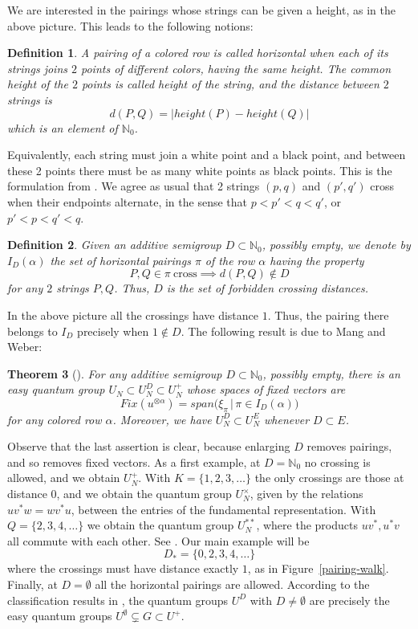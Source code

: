 \documentclass[11pt,a4paper]{article}
\newtheorem{thm}{Theorem}[section]
\newtheorem{defn}[thm]{Definition}
\begin{document}
We are interested in the pairings whose strings can be given a height, as in the above picture. This leads to the following notions:

\begin{defn}\label{horizontal}
A pairing of a colored row is called horizontal when each of its strings joins $2$ points of different colors, having the same height. The common height of the $2$ points is called height of the string, and the distance between $2$ strings is
\[
 d(P,Q)=|height(P)-height(Q)|
\]
which is an element of $\mathbb N_0$.
\end{defn}

Equivalently, each string must join a white point and a black point, and between these 2 points there must be as many white points as black points. This is the formulation from \cite{semi}. We agree as usual that 2 strings $(p,q)$ and $(p',q')$ cross when their endpoints alternate, in the sense that $p<p'<q<q'$, or $p'<p<q'<q$.

\begin{defn}\label{unitary-def}
Given an additive semigroup $D\subset\mathbb N_0$, possibly empty, we denote by $I_D(\alpha)$ the set of horizontal pairings $\pi$ of the row $\alpha$ having the property
\[
 P,Q\in\pi\ \text{cross}\implies d(P,Q)\notin D
\]
for any $2$ strings $P,Q$. Thus, $D$ is the set of forbidden crossing distances.
\end{defn}

In the above picture all the crossings have distance $1$. Thus, the pairing there belongs to $I_D$ precisely when $1\notin D$. The following result is due to Mang and Weber:

\begin{thm}[\cite{semi}]\label{mang-weber}
For any additive semigroup $D\subset\mathbb N_0$, possibly empty, there is an easy quantum group $U_N\subset U_N^D\subset U_N^+$ whose spaces of fixed vectors are
\[
 Fix(u^{\otimes\alpha})=span\big(\xi_\pi\,\big|\,\pi\in I_D(\alpha)\big)
\]
for any colored row $\alpha$. Moreover, we have $U_N^D\subset U_N^E$ whenever $D\subset E$.
\end{thm}

Observe that the last assertion is clear, because enlarging $D$ removes pairings, and so removes fixed vectors. As a first example, at $D=\mathbb N_0$ no crossing is allowed, and we obtain $U_N^+$. With $K=\{1,2,3,\ldots\}$ the only crossings are those at distance $0$, and we obtain the quantum group $U_N^\times$, given by the relations $uv^*w=wv^*u$, between the entries of the fundamental representation. With $Q=\{2,3,4,\ldots\}$ we obtain the quantum group $U_N^{**}$, where the products $uv^*,u^*v$ all commute with each other. See \cite{semi}. Our main example will be
\[
 D_*=\{0,2,3,4,\ldots\}
\]
where the crossings must have distance exactly $1$, as in Figure~\ref{pairing-walk}. Finally, at $D=\emptyset$ all the horizontal pairings are allowed. According to the classification results in \cite{cyclic,semi}, the quantum groups $U^D$ with $D\neq\emptyset$ are precisely the easy quantum groups $U^\emptyset\subsetneq G\subset U^+$.
\end{document}
